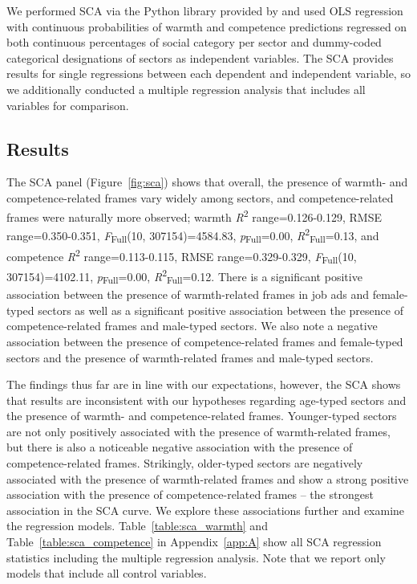 \documentclass[man]{apa7}
\begin{document}
We performed SCA via the Python library provided by \Textcite{aeturrell_2022_7264033} and used OLS regression with continuous probabilities of warmth and competence predictions regressed on both continuous percentages of social category per sector and dummy-coded categorical designations of sectors as independent variables. The SCA provides results for single regressions between each dependent and independent variable, so we additionally conducted a multiple regression analysis that includes all variables for comparison.

\subsection{Results}
\label{results}
The SCA panel (Figure~\ref{fig:sca}) shows that overall, the presence of warmth- and competence-related frames vary widely among sectors, and competence-related frames were naturally more observed; warmth \textit{R}\textsuperscript{2} range=0.126-0.129, RMSE range=0.350-0.351, \textit{F}\textsubscript{Full}(10, 307154)=4584.83, \textit{p}\textsubscript{Full}=0.00, \textit{R}\textsuperscript{2}\textsubscript{Full}=0.13, and competence \textit{R}\textsuperscript{2} range=0.113-0.115, RMSE range=0.329-0.329, \textit{F}\textsubscript{Full}(10, 307154)=4102.11, \textit{p}\textsubscript{Full}=0.00, \textit{R}\textsuperscript{2}\textsubscript{Full}=0.12. There is a significant positive association between the presence of warmth-related frames in job ads and female-typed sectors as well as a significant positive association between the presence of competence-related frames and male-typed sectors. We also note a negative association between the presence of competence-related frames and female-typed sectors and the presence of warmth-related frames and male-typed sectors.

The findings thus far are in line with our expectations, however, the SCA shows that results are inconsistent with our hypotheses regarding age-typed sectors and the presence of warmth- and competence-related frames. Younger-typed sectors are not only positively associated with the presence of warmth-related frames, but there is also a noticeable negative association with the presence of competence-related frames. Strikingly, older-typed sectors are negatively associated with the presence of warmth-related frames and show a strong positive association with the presence of competence-related frames – the strongest association in the SCA curve. We explore these associations further and examine the regression models. Table~\ref{table:sca_warmth} and Table~\ref{table:sca_competence} in Appendix~\ref{app:A} show all SCA regression statistics including the multiple regression analysis. Note that we report only models that include all control variables.
\end{document}
